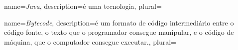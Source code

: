 {
	name={\textit{Java}},
	description={é uma tecnologia},
	plural={}
}

{
	name={\textit{Bytecode}},
	description={é um formato de código intermediário entre o código fonte, o texto que o programador consegue manipular, e o código de máquina, que o computador consegue executar.},
	plural={}
}


 




